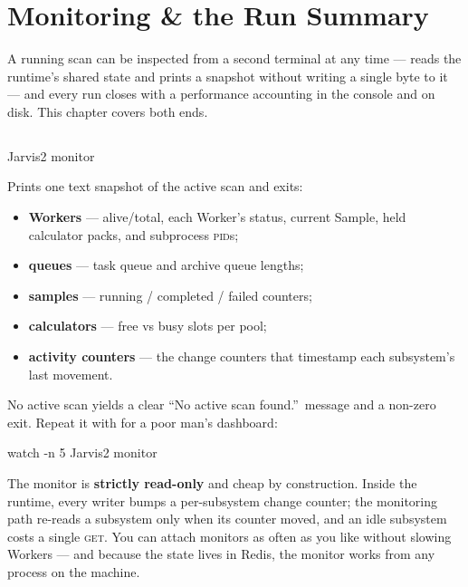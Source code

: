 \chapter{Monitoring \& the Run Summary}
\label{ch:monitoring}

 A running scan can be inspected from a
second terminal at any time ---  reads the runtime's shared state
and prints a snapshot without writing a single byte to it --- and every run closes with
a performance accounting in the console and on disk. This chapter covers both ends.

\section{}
\label{sec:monitor-cli}

\begin{terminal}
\begin{jcmd}
Jarvis2 monitor
\end{jcmd}
\end{terminal}

Prints one text snapshot of the active scan and exits:

\begin{itemize}
  \item \textbf{Workers} --- alive/total, each Worker's status, current Sample, held
        calculator packs, and subprocess \textsc{pid}s;
  \item \textbf{queues} --- task queue and archive queue lengths;
  \item \textbf{samples} --- running / completed / failed counters;
  \item \textbf{calculators} --- free vs busy slots per pool;
  \item \textbf{activity counters} --- the change counters that timestamp each
        subsystem's last movement.
\end{itemize}

No active scan yields a clear ``No active scan found.''\ message and a non-zero exit.
Repeat it with  for a poor man's dashboard:

\begin{terminal}
\begin{jcmd}
watch -n 5 Jarvis2 monitor
\end{jcmd}
\end{terminal}

\begin{jnote}
The monitor is \textbf{strictly read-only} and cheap by construction. Inside the
runtime, every writer bumps a per-subsystem change counter; the monitoring path
re-reads a subsystem only when its counter moved, and an idle subsystem costs a single
\textsc{get}. You can attach monitors as often as you like without slowing Workers ---
and because the state lives in Redis, the monitor works from any process on the
machine.
\end{jnote}

